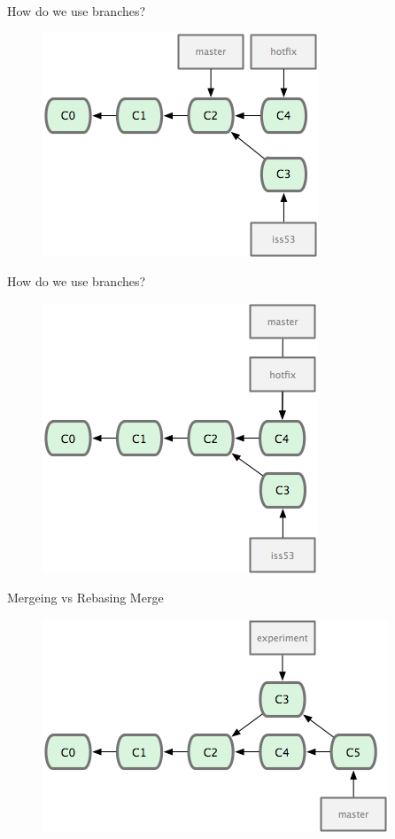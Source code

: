 \documentclass[14pt]{beamer}
\begin{document}
\begin{frame}{How do we use branches?}
	\begin{figure}[htb]
		\centering
		\includegraphics[width=.7\textwidth]{hotfix.png}
	\end{figure}
\end{frame}

\begin{frame}{How do we use branches?}
	\begin{figure}[htb]
		\centering
		\includegraphics[width=.7\textwidth]{hotfix2.png}
	\end{figure}
\end{frame}

\begin{frame}{Mergeing vs Rebasing}
	Merge
	\begin{figure}[htb]
		\centering
		\includegraphics[width=.7\textwidth]{merge.png}
	\end{figure}
\end{frame}
\end{document}

